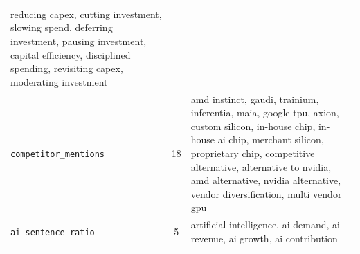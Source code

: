 \documentclass[10pt,letterpaper,twocolumn]{article}
\begin{document}
{\begin{longtable}{@{}l c p{}@{}}
reducing capex, cutting investment, slowing spend, deferring investment,
pausing investment, capital efficiency, disciplined spending, revisiting capex,
moderating investment \\
\addlinespace
\texttt{competitor\_mentions} & 18 &
amd instinct, gaudi, trainium, inferentia, maia, google tpu, axion, custom silicon,
in-house chip, in-house ai chip, merchant silicon, proprietary chip,
competitive alternative, alternative to nvidia, amd alternative, nvidia alternative,
vendor diversification, multi vendor gpu \\
\addlinespace
\texttt{ai\_sentence\_ratio} & 5 &
artificial intelligence, ai demand, ai revenue, ai growth, ai contribution \\
\end{longtable}
}
\end{document}
